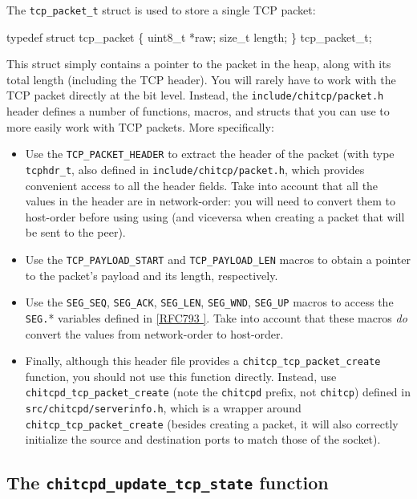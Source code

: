 \documentclass[10pt]{article}
\newcommand{\RFCsection}[2]{\href{http://tools.ietf.org/html/rfc#1\#section-#2}{[RFC#1 \textsection #2]}}
\newenvironment{example}%
{\VerbatimEnvironment\begin{Sbox}\begin{VerbExample}}%
{\end{VerbExample}\end{Sbox}\setlength{\fboxsep}{8pt}\begin{center}\fcolorbox{black}{backgroundgray}{\TheSbox}\end{center}}
\begin{document}
The \texttt{tcp\_packet\_t} struct is used to store a single TCP packet:

\begin{example}
typedef struct tcp_packet
\{
    uint8_t *raw;
    size_t  length;
\} tcp_packet_t;
\end{example}

This struct simply contains a pointer to the packet in the heap, along with its total length (including the TCP header). You will rarely have to work with the TCP packet directly at the bit level. Instead, the \texttt{include/chitcp/packet.h} header defines a number of functions, macros, and structs that you can use to more easily work with TCP packets. More specifically:

\begin{itemize}
\item Use the \texttt{TCP\_PACKET\_HEADER} to extract the header of the packet (with type \texttt{tcphdr\_t}, also defined in \texttt{include/chitcp/packet.h}, which provides convenient access to all the header fields. Take into account that all the values in the header are in network-order: you will need to convert them to host-order before using using (and viceversa when creating a packet that will be sent to the peer).

\item Use the \texttt{TCP\_PAYLOAD\_START} and \texttt{TCP\_PAYLOAD\_LEN} macros to obtain a pointer to the packet's payload and its length, respectively.

\item Use the \texttt{SEG\_SEQ}, \texttt{SEG\_ACK}, \texttt{SEG\_LEN}, \texttt{SEG\_WND}, \texttt{SEG\_UP} macros to access the \texttt{SEG.}* variables defined in \RFCsection{793}{3.2}. Take into account that these macros \emph{do} convert the values from network-order to host-order.

\item Finally, although this header file provides a \texttt{chitcp\_tcp\_packet\_create} function, you should not use this function directly. Instead, use \texttt{chitcpd\_tcp\_packet\_create} (note the \texttt{chitcpd} prefix, not \texttt{chitcp}) defined in \texttt{src/chitcpd/serverinfo.h}, which is a wrapper around \texttt{chitcp\_tcp\_packet\_create} (besides creating a packet, it will also correctly initialize the source and destination ports to match those of the socket).
\end{itemize}

\subsection{The \texttt{chitcpd\_update\_tcp\_state} function}
\end{document}

